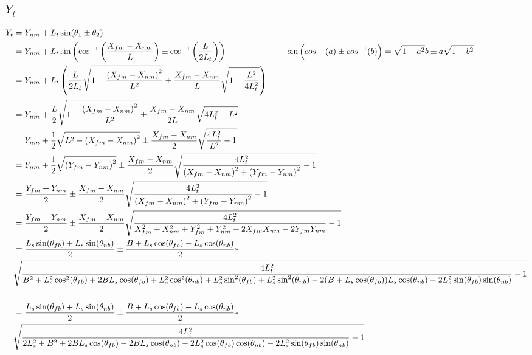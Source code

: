 \documentclass[11pt, landscape]{article}
\begin{document}
\subsection{$Y_t$}
\begin{align*}
  Y_t &= Y_{nm} + L_t\sin(\theta_1 \pm \theta_2)\\
  &= Y_{nm} + L_t\sin\left(\cos^{-1}\left(\frac{X_{fm}-X_{nm}}{L}\right) \pm \cos^{-1}\left(\frac{L}{2L_t}\right) \right)
  \hspace*{1in} \sin\Big(cos^{-1}(a)\pm cos^{-1}(b)\Big) = \sqrt{1-a^2}b\pm a\sqrt{1-b^2}\\
  &= Y_{nm} + L_t\left(\frac{L}{2L_t}\sqrt{1 - \frac{\left(X_{fm}-X_{nm}\right)^2}{L^2}} \pm \frac{X_{fm}-X_{nm}}{L}\sqrt{1 - \frac{L^2}{4L^2_t}}\right)\\
  &= Y_{nm} + \frac{L}{2}\sqrt{1 - \frac{\left(X_{fm}-X_{nm}\right)^2}{L^2}} \pm \frac{X_{fm}-X_{nm}}{2L}\sqrt{4L_t^2 - L^2}\\
  &= Y_{nm} + \frac{1}{2}\sqrt{L^2 - \left(X_{fm}-X_{nm}\right)^2} \pm \frac{X_{fm}-X_{nm}}{2}\sqrt{\frac{4L_t^2}{L^2} - 1}\\
  &= Y_{nm} + \frac{1}{2}\sqrt{\left(Y_{fm}-Y_{nm}\right)^2} \pm \frac{X_{fm}-X_{nm}}{2}\sqrt{\frac{4L_t^2}{\left(X_{fm}-X_{nm}\right)^2 + \left(Y_{fm}-Y_{nm}\right)^2} - 1}\\
  &= \frac{Y_{fm} + Y_{nm}}{2} \pm \frac{X_{fm}-X_{nm}}{2}\sqrt{\frac{4L_t^2}{\left(X_{fm}-X_{nm}\right)^2 + \left(Y_{fm}-Y_{nm}\right)^2} - 1}\\
  &= \frac{Y_{fm} + Y_{nm}}{2} \pm \frac{X_{fm}-X_{nm}}{2}\sqrt{\frac{4L_t^2}{X_{fm}^2 + X_{nm}^2 + Y_{fm}^2 + Y_{nm}^2 -2X_{fm}X_{nm} -2Y_{fm}Y_{nm}} - 1}\\
  &= \frac{L_s\sin(\theta_{fb}) + L_s\sin(\theta_{nb})}{2} \pm \frac{B + L_s\cos(\theta_{fb}) - L_s\cos(\theta_{nb})}{2} *\\
  &\sqrt{\frac{4L_t^2}{B^2 + L_s^2\cos^2(\theta_{fb}) + 2BL_s\cos(\theta_{fb}) + L_s^2\cos^2(\theta_{nb}) + L_s^2\sin^2(\theta_{fb}) + L_s^2\sin^2(\theta_{nb}) -2(B + L_s\cos(\theta_{fb}))L_s\cos(\theta_{nb}) -2L_s^2\sin(\theta_{fb})\sin(\theta_{nb})} - 1}\\\\
  &= \frac{L_s\sin(\theta_{fb}) + L_s\sin(\theta_{nb})}{2} \pm \frac{B + L_s\cos(\theta_{fb}) - L_s\cos(\theta_{nb})}{2} *\\
  &\sqrt{\frac{4L_t^2}{2L_s^2 + B^2 + 2BL_s\cos(\theta_{fb}) -2BL_s\cos(\theta_{nb}) - 2L_s^2\cos(\theta_{fb})\cos(\theta_{nb}) - 2L_s^2\sin(\theta_{fb})\sin(\theta_{nb})} - 1}\\\\

\end{align*}
\end{document}
